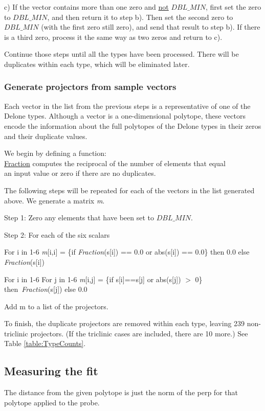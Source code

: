 \documentclass[preprint]{iucr}              %
\begin{document}
 c) If the vector contains more than one zero and \underline{not} $DBL\_MIN$, 
 first set the zero to $DBL\_MIN$,  and then return it to 
 step b). Then set the second zero to $DBL\_MIN$ (with the
 first zero still zero), and send that result to step b). 
 If there is a third zero,  process it the same way as two zeros and return to c).
 
 Continue those steps until all the types have been processed. 
 There will be duplicates within each type,
 which will be eliminated later.
 
 
 \subsubsection{Generate projectors from sample vectors}
 
 Each vector in the list from the previous steps is a representative of one
 of the Delone types. Although a vector is a one-dimensional polytope,
 these vectors encode the information about the full polytopes of the
 Delone types in their zeros and their duplicate values.
 
 We begin by defining a function: \\ \relax
\underline{Fraction} computes the reciprocal of the 
number of elements that equal \\ \relax
 an input value or zero if there are no duplicates.
 
 The following steps will be repeated for each of the vectors in the
 list generated above. We generate a matrix \textit{m}.
 
 Step 1: Zero any elements that have been set to $DBL\_MIN$.
 
 Step 2: For each of the six scalars
 
 For i in 1-6
 	\textit{m}[i,i] = \{if \textit{Fraction}(s[i]) == 0.0 or abs(s[i]) == 0.0\} then 0.0 else \textit{Fraction}(s[i])
 	
For i in 1-6
For j in 1-6
\textit{m}[i,j] 	= \{if s[i]==s[j] or abs(s[j]) $>$ 0\} then~\textit{Fraction}(s[j]) else 0.0

Add m to a list of the projectors.

 
To finish, the duplicate projectors are removed within each type, 
leaving 239 non-triclinic projectors. (If the triclinic cases are 
included, there are 10 more.) See Table \ref{table:TypeCounts}.

 
\subsection {Measuring the fit}
The distance from the given polytope is just
the norm of the perp for that polytope applied to the probe.
\end{document}
